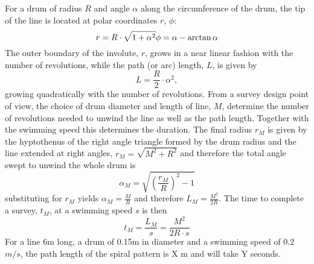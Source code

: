 

For a drum of radius $R$ and angle $\alpha$ along the circumference of the drum, the tip of the line is located at polar coordinates $r$, $\phi$:  
\begin{equation}
r = R\cdot\sqrt{1+\alpha^2} \\
\phi = \alpha - \arctan{\alpha} 
\end{equation}
The outer boundary of the involute, $r$, grows in a near linear fashion with the number of revolutions, while the path (or arc) length, $L$, is given by
\begin{equation}
L=\frac{R}{2}\cdot\alpha^2,
\end{equation}
growing quadratically with the number of revolutions. 
From a survey design point of view, the choice of drum diameter and length of line, $M$, determine the number of revolutions needed to unwind the line as well as the path length. Together with the swimming speed this determines the duration. The final radius $r_M$ is given by the hyptothenus of the right angle triangle formed by the drum radius and the line extended at right angles, $r_M = \sqrt{M^2 + R^2}$ and therefore the total angle swept to unwind the whole drum is 
\begin{equation}
\alpha_M = \sqrt{\left(\frac{r_M}{R}\right)^2 - 1}
\end{equation}
substituting for $r_M$ yields $\alpha_M = \frac{M}{R}$ and therefore $L_M = \frac{M^2}{2R}$. The time to complete a survey, $t_M$, at a swimming speed $s$ is then
\begin{equation}
t_M = \frac{L_M}{s} = \frac{M^2}{2R\cdot s}
\end{equation}
For a line 6m long, a drum of 0.15m in diameter and a swimming speed of 0.2 $m/s$, the path length of the spiral pattern is X m and will take Y seconds.


    
  
  
  
  
  